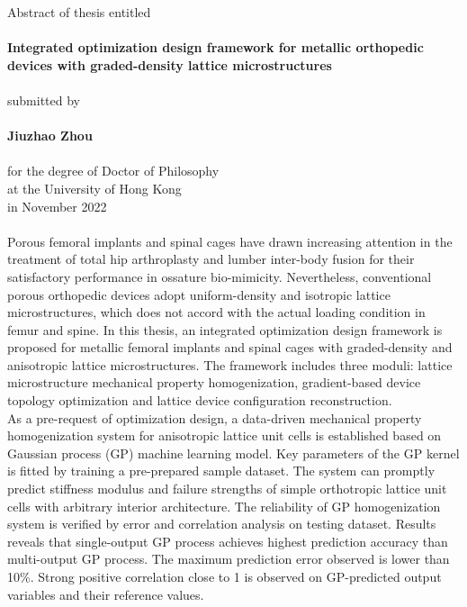 \documentclass[12pt]{extbook}
\begin{document}
\centering
Abstract of thesis entitled\\
~\\
{\Large \bf Integrated optimization design framework for metallic orthopedic devices with graded-density lattice microstructures}\\
~\\
submitted by\\
~\\
{\Large \bf Jiuzhao Zhou}\\
~\\
for the degree of Doctor of Philosophy\\
at the University of Hong Kong\\
in November 2022\\
~\\
\justifying
Porous femoral implants and spinal cages have drawn increasing attention in the treatment of total hip arthroplasty and lumber inter-body fusion for their satisfactory performance in ossature bio-mimicity. Nevertheless, conventional porous orthopedic devices adopt uniform-density and isotropic lattice microstructures, which does not accord with the actual loading condition in femur and spine. In this thesis, an integrated optimization design framework is proposed for metallic femoral implants and spinal cages with graded-density and anisotropic lattice microstructures. The framework includes three moduli: lattice microstructure mechanical property homogenization, gradient-based device topology optimization and lattice device configuration reconstruction.\\

As a pre-request of optimization design, a data-driven mechanical property homogenization system for anisotropic lattice unit cells is established based on Gaussian process (GP) machine learning model. Key parameters of the GP kernel is fitted by training a pre-prepared sample dataset. The system can promptly predict stiffness modulus and failure strengths of simple orthotropic lattice unit cells with arbitrary interior architecture. The reliability of GP homogenization system is verified by error and correlation analysis on testing dataset. Results reveals that single-output GP process achieves highest prediction accuracy than multi-output GP process. The maximum prediction error observed is lower than 10\%. Strong positive correlation close to 1 is observed on GP-predicted output variables and their reference values.\\
\end{document}
